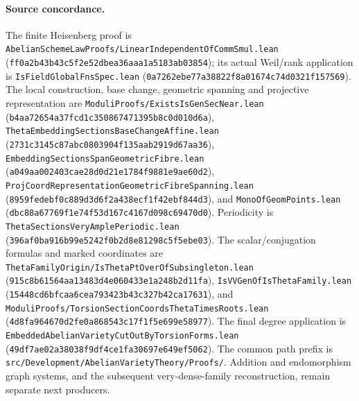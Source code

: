 \paragraph{Source concordance.}
The finite Heisenberg proof is
\texttt{AbelianSchemeLawProofs/LinearIndependentOfCommSmul.lean}
(\texttt{ff0a2b43b43c5f2e52dbea36aaa1a5183ab03854});
its actual Weil/rank application is
\texttt{IsFieldGlobalFnsSpec.lean}
(\texttt{0a7262ebe77a38822f8a01674c74d0321f157569}).
The local construction, base change, geometric spanning
and projective representation are
\texttt{ModuliProofs/ExistsIsGenSecNear.lean}
(\texttt{b4aa72654a37fcd1c350867471395b8c0d010d6a}),
\texttt{ThetaEmbeddingSectionsBaseChangeAffine.lean}
(\texttt{2731c3145c87abc0803904f135aab2919d67aa36}),
\texttt{EmbeddingSectionsSpanGeometricFibre.lean}
(\texttt{a049aa002403cae28d0d21e1784f9881e9ae60d2}),
\texttt{ProjCoordRepresentationGeometricFibreSpanning.lean}
(\texttt{8959fedebf0c889d3d6f2a438ecf1f42ebf844d3}),
and \texttt{MonoOfGeomPoints.lean}
(\texttt{dbc88a67769f1e74f53d167c4167d098c69470d0}).
Periodicity is
\texttt{ThetaSectionsVeryAmplePeriodic.lean}
(\texttt{396af0ba916b99e5242f0b2d8e81298c5f5ebe03}).
The scalar/conjugation formulas and marked coordinates
are
\texttt{ThetaFamilyOrigin/IsThetaPtOverOfSubsingleton.lean}
(\texttt{915c8b61564aa13483d4e060433e1a248b2d11fa}),
\texttt{IsVVGenOfIsThetaFamily.lean}
(\texttt{15448cd6bfcaa6cea793423b43c327b42ca17631}),
and \texttt{ModuliProofs/TorsionSectionCoordsThetaTimesRoots.lean}
(\texttt{4d8fa964670d2fe0a868543c17f1f5e699e58977}).
The final degree application is
\texttt{EmbeddedAbelianVarietyCutOutByTorsionForms.lean}
(\texttt{49df7ae02a38038f9df4ce1fa30697e649ef5062}).
The common path prefix is
\texttt{src/Development/AbelianVarietyTheory/Proofs/}.
Addition and endomorphism graph systems, and the
subsequent very-dense-family reconstruction, remain
separate next producers.
